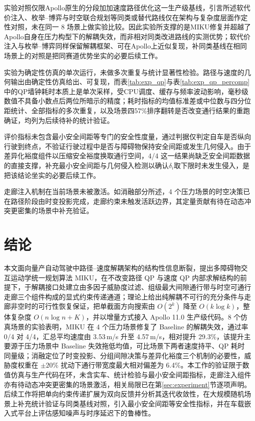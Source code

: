 \documentclass[a4paper,zihao=5]{ctexart}
\theoremstyle{definition}
\begin{document}
实验对照仅限Apollo原生的分段加加速度路径优化这一生产级基线，引言所述软代价注入、枚举--博弈与时空联合规划等同类或替代路线仅在架构与复杂度层面作定性对照，未在同一 8 场景上做实验比较。因此实验所支撑的是MIKU修复并超越了Apollo自身在压力构型下的解耦失效，而非相对同类改进路线的实测优势；软代价注入与枚举--博弈同样保留解耦框架、可在Apollo上近似复现，补同类基线在相同场景上的对照是把同赛道优势坐实的必要后续工作。

实验为确定性仿真的单次运行，未做多次重复与统计显著性检验。路径与速度的几何输出由确定性仿真给出、可复现，而表\ref{tab:exp_qp}与表\ref{tab:exp_qp_percomp}中的QP墙钟耗时本质上是单次采样，受CPU调度、缓存与频率波动影响，毫秒级数值不具备小数点后两位所暗示的精度；耗时指标的均值标准差或中位数与四分位距统计、全部指标的多次重复，以及场景四57\%排序翻转是否改变通行结果的重跑确证，均列为后续待补的统计验证。

评价指标未包含最小安全间距等专门的安全性度量，通过判据仅判定自车是否纵向行驶到终点，不验证行驶过程中是否与障碍物保持安全间距或发生几何侵入。由于差异化裕度组件以压缩安全裕度换取通行空间，4/4 这一结果尚缺乏安全间距数据的直接支撑，补充最小安全间距与几何侵入检测以确认$\delta_i$取下限时未发生侵入，是把该结论坐实的必要后续工作。

走廊注入机制在当前场景未被激活。如消融部分所述，4 个压力场景的时空决策已在路径阶段由时变投影完成，走廊约束未触发活跃边界，其定量贡献有待在动态冲突更密集的场景中补充验证。

\section{结论}
\label{sec:conclusion}

本文面向量产自动驾驶中路径--速度解耦架构的结构性信息断裂，提出多障碍物交互运动学统一规划算法 MIKU，在不改变路径 QP 与速度 QP 内部求解结构的前提下，于解耦接口处建立由多因子威胁度过滤、组级最大间隙通行带与时空可通行走廊三个组件构成的显式约束传递通道；理论上给出纯解耦不可行的充分条件与走廊非空时的可行性恢复保证，把单截面方向搜索由 $O(2^k)$ 降至 $O(k\log k)$，整体复杂度 $O(n\log n + K)$，并以增量方式接入 Apollo 11.0 生产级代码。8 个仿真场景的实验表明，MIKU 在 4 个压力场景修复了 Baseline 的解耦失效，通过率 0/4 对 4/4，汇总平均速度由 3.53\,m/s 升至 4.57\,m/s，相对提升 29.3\%，该提升主要源于压力场景中 Baseline 失效拖低均值，可比场景下两者速度持平、QP 耗时同量级；消融定位了时变投影、分组间隙决策与差异化裕度三个机制的必要性，威胁度权重在 $\pm 20\%$ 扰动下通行带宽度最大相对偏差为 6.4\%。本工作的验证限于数值仿真与生产代码在环，未含实车、统计检验与最小安全间距指标，走廊注入组件亦有待动态冲突更密集的场景激活，相关局限已在第\ref{sec:experiment}节逐项声明。后续工作将把单向约束传递扩展为双向反馈并分析其迭代收敛性，在大规模随机场景上补充统计验证与同类基线对照，引入最小安全间距等安全性指标，并在车载嵌入式平台上评估感知噪声与时序延迟下的鲁棒性。

\printbibliography[heading=bibintoc,title={参考文献}]
\end{document}
